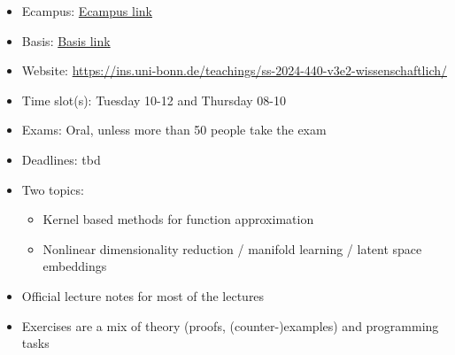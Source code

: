 \begin{tcolorbox}[enhanced,breakable,
	title=General Information,frame style={color=mycolor}]
    \begin{itemize}
        \item Ecampus: \href{https://ecampus.uni-bonn.de/goto.php?target=crs_3306528&client_id=ecampus}{Ecampus link}
        \item Basis: \href{https://basis.uni-bonn.de/qisserver/rds?state=verpublish&status=init&vmfile=no&publishid=239856&moduleCall=webInfo&publishConfFile=webInfo&publishSubDir=veranstaltung}{Basis link}
        \item Website: \href{https://ins.uni-bonn.de/teachings/ss-2024-440-v3e2-wissenschaftlich/}{https://ins.uni-bonn.de/teachings/ss-2024-440-v3e2-wissenschaftlich/}
        \item Time slot(s): Tuesday 10-12 and Thursday 08-10
        \item Exams: Oral, unless more than 50 people take the exam
        \item Deadlines: tbd
        \item Two topics:\begin{itemize}
            \item Kernel based methods for function approximation
            \item Nonlinear dimensionality reduction / manifold learning / latent space embeddings
        \end{itemize}
        \item Official lecture notes for most of the lectures 
        \item Exercises are a mix of theory (proofs, (counter-)examples) and programming tasks
    \end{itemize}
\end{tcolorbox}
